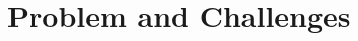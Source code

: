 \documentclass[sigconf]{acmart}
\newcommand{\nb}[1]{\textcolor{blue}{NB[#1]}}
\begin{document}

\section{Problem and Challenges}\label{Sec::Methods}




\end{document}
